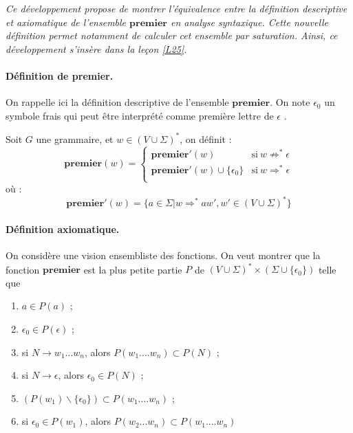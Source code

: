 
\textit{Ce développement propose de montrer l'équivalence entre la définition descriptive et axiomatique de l'ensemble $\mathbf{premier}$ en analyse syntaxique. Cette nouvelle définition permet notamment de calculer cet ensemble par saturation. Ainsi, ce développement s'insère dans la leçon \ref{L25}.}

\paragraph{Définition de premier.} On rappelle ici la définition descriptive de l'ensemble $\mathbf{premier}$. On note $\epsilon_0$ un symbole frais qui peut être interprété comme \og première lettre de $\epsilon$ \fg{}. 

\begin{definition}
Soit $G$ une grammaire, et $w \in (V \cup \Sigma)^*$, on définit :
$$
\mathbf{premier}(w) = \left\lbrace 
\begin{array}{ll}
\mathbf{premier}'(w) &\text{si} ~ w \not\Rightarrow^* \epsilon \\
\mathbf{premier}'(w) \cup \{\epsilon_0\} &\text{si} ~ w \Rightarrow^* \epsilon \\
\end{array}\right.
$$
où :
$$
\mathbf{premier}'(w) = \{a\in \Sigma | w \Rightarrow^* aw', w'\in (V \cup \Sigma)^*\}
$$
\end{definition}


\paragraph{Définition axiomatique.}
On considère une vision ensembliste des fonctions. On veut montrer que la fonction $\mathbf{premier}$ est la plus petite partie $P$ de $(V\cup \Sigma)^* \times (\Sigma\cup\{\epsilon_0\})$ telle que 
\begin{enumerate}
\item $a\in P(a)$ ;
\item $\epsilon_0 \in P(\epsilon)$ ;
\item si $N \rightarrow w_1...w_n$, alors $P(w_1....w_n) \subset P(N)$ ;
\item si $N\rightarrow \epsilon$, alors $\epsilon_0\in P(N)$ ;
\item $(P(w_1) \backslash \{\epsilon_0 \}) \subset P(w_1....w_n)$ ;
\item si $\epsilon_0 \in P(w_1)$, alors $P(w_2...w_n) \subset P(w_1....w_n)$ 
\end{enumerate}



